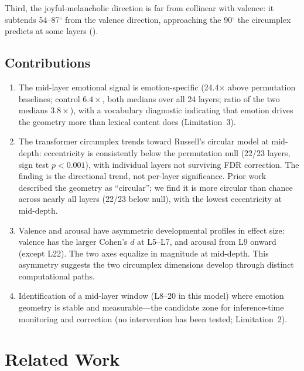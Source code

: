 \documentclass[11pt,a4paper]{article}
\begin{document}
Third, the joyful-melancholic direction is far from collinear with
valence: it subtends 54--87$^\circ$ from the valence direction,
approaching the 90$^\circ$ the circumplex predicts at some layers
().

\subsection*{Contributions}

\begin{enumerate}[nosep]
    \item The mid-layer emotional signal is emotion-specific
          (24.4$\times$ above permutation baselines; control
          $6.4\times$, both medians over all 24 layers; ratio of the two medians $3.8\times$), with a vocabulary
          diagnostic indicating that emotion drives the geometry more than
          lexical content does (Limitation~3).
    \item The transformer circumplex trends toward Russell's circular
          model at mid-depth: eccentricity is consistently below the
          permutation null (22/23 layers, sign test $p < 0.001$), with
          individual layers not surviving FDR correction. The finding is
          the directional trend, not per-layer significance. Prior work
          \citep{sun2026valence} described the geometry as ``circular'';
          we find it is more circular than chance across nearly all
          layers (22/23 below null), with the lowest eccentricity at
          mid-depth.
    \item Valence and arousal have asymmetric developmental profiles in
          effect size: valence has the larger Cohen's $d$ at L5--L7, and
          arousal from L9 onward (except L22). The two axes equalize in magnitude
          at mid-depth. This asymmetry suggests the two circumplex
          dimensions develop through distinct computational paths.
    \item Identification of a mid-layer window (L8--20 in this model)
          where emotion geometry is stable and measurable---the candidate
          zone for inference-time monitoring and correction (no
          intervention has been tested; Limitation~2).
\end{enumerate}

\section{Related Work}
\label{sec:related}
\end{document}
